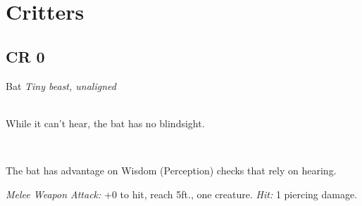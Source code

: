 \documentclass[10pt,twoside,twocolumn,openany]{book}
\begin{document}

\chapter{Critters}
\section{CR 0}
\begin{monsterboxnobg}{Bat}
	\textit{Tiny beast, unaligned}\\
	\hline
	\basics[%
	armorclass = 12,
	hitpoints  = 1 (1d4 - 1),
	speed      = {5 ft., fly 30 ft.}
	]
	\hline
	\stats[
    STR = \stat{2}, %
    DEX = \stat{15},
    CON = \stat{8},
    INT = \stat{2},
    WIS = \stat{12},
    CHA = \stat{4}
	]
	\hline
	\details[%
	senses = {blindsight 60 ft., passive Perception 11},
	]
	\hline \\[1mm]
	\begin{monsteraction}[Echolocation]
		While it can't hear, the bat has no blindsight.
	\end{monsteraction}
	\\
	\begin{monsteraction}
		The bat has advantage on Wisdom (Perception) checks that rely on hearing.
	\end{monsteraction}
	\begin{monsteraction}[Bite]
		\textit{Melee Weapon Attack:} +0 to hit, reach 5ft., one creature. \textit{Hit:} 1 piercing damage.
	\end{monsteraction}
\end{monsterboxnobg}
\newpage
\end{document}
